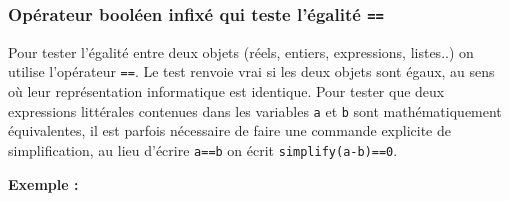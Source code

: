 \documentclass[12pt,a4paper]{book}
\begin{document}
\begin{giacjshere}
\subsubsection{Op\'erateur bool\'een infix\'e qui teste l'\'egalit\'e {\tt ==}}
\index{==}
Pour tester l'\'egalit\'e entre deux objets (r\'eels, entiers, expressions, 
listes..) on utilise l'op\'erateur \verb|==|. Le test renvoie vrai si les
deux objets sont \'egaux, au sens o\`u leur repr\'esentation informatique
est identique. Pour tester que deux expressions litt\'erales
contenues dans les variables \verb|a| et \verb|b|
sont math\'ematiquement
\'equivalentes, il est parfois n\'ecessaire de faire une commande explicite
de simplification, au lieu d'\'ecrire \verb|a==b| on \'ecrit 
\verb|simplify(a-b)==0|.

{\bf Exemple :}\\ 
\\ 
\\
\\


\end{giacjshere}
\end{document}
